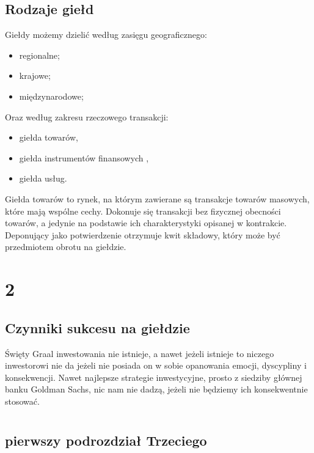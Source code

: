 \documentclass{report}
\begin{document}
\section {Rodzaje giełd}
Giełdy możemy dzielić według zasięgu geograficznego:
\begin{itemize}
\item regionalne;
\item krajowe;
\item międzynarodowe;
\end{itemize}
Oraz według zakresu rzeczowego transakcji:
\begin{itemize}
\item giełda towarów,
\item giełda instrumentów finansowych ,
\item giełda usług.
\end{itemize}
Giełda towarów to rynek, na którym zawierane są transakcje towarów masowych, które mają wspólne cechy. Dokonuje się transakcji bez fizycznej obecności towarów, a jedynie na podstawie ich charakterystyki opisanej w kontrakcie. Deponujący jako potwierdzenie otrzymuje kwit składowy, który może być przedmiotem obrotu na giełdzie.
\newline
\newpage
\chapter{2}
\section{Czynniki sukcesu na giełdzie}
Święty Graal inwestowania nie istnieje, a nawet jeżeli istnieje to niczego inwestorowi nie da jeżeli nie posiada on w sobie opanowania emocji, dyscypliny i konsekwencji. Nawet najlepsze strategie inwestycyjne, prosto z siedziby głównej banku Goldman Sachs, nic nam nie dadzą, jeżeli nie będziemy ich konsekwentnie stosować.


\newpage
\chapter{}
\section{pierwszy podrozdział Trzeciego}
\newpage


\end{document}

